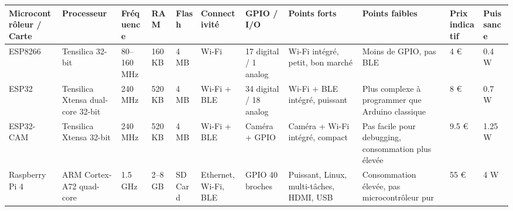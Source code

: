 \begin{landscape}
    \begin{table}[!ht]
        \centering
        \begin{tabularx}{\textwidth}{
            |p{3.5cm}|p{2.5cm}|p{2.2cm}|p{1.2cm}|p{1.4cm}|
            p{2.7cm}|p{2.5cm}|p{3cm}|p{3cm}|p{1.8cm}|p{2.2cm}|
            }
            \hline
            \textbf{Microcontrôleur / Carte} & \textbf{Processeur}               & \textbf{Fréquence}    & \textbf{RAM}            & \textbf{Flash} &
            \textbf{Connectivité}            & \textbf{GPIO / I/O}               & \textbf{Points forts} & \textbf{Points faibles} &
            \textbf{Prix indicatif}          & \textbf{Puissance}                                                                                                                                                                                                                                                                                     \\
            \hline
            ESP8266                          & Tensilica 32-bit                  & 80–160 MHz            & 160 KB                  & 4 MB           & Wi-Fi                & 17 digital / 1 analog  & Wi-Fi intégré, petit, bon marché                                       & Moins de GPIO, pas BLE                              & 4 €    & 0.4 W   \\
            \hline
            ESP32                            & Tensilica Xtensa dual-core 32-bit & 240 MHz               & 520 KB                  & 4 MB           & Wi-Fi + BLE          & 34 digital / 18 analog & Wi-Fi + BLE intégré, puissant                                          & Plus complexe à programmer que Arduino classique    & 8 €    & 0.7 W   \\
            \hline
            ESP32-CAM                        & Tensilica Xtensa 32-bit           & 240 MHz               & 520 KB                  & 4 MB           & Wi-Fi + BLE          & Caméra + GPIO          & Caméra + Wi-Fi intégré, compact                                        & Pas facile pour debugging, consommation plus élevée & 9.5 €  & 1.25 W  \\
            \hline
            Raspberry Pi 4                   & ARM Cortex-A72 quad-core          & 1.5 GHz               & 2–8 GB                  & SD Card        & Ethernet, Wi-Fi, BLE & GPIO 40 broches        & Puissant, Linux, multi-tâches, HDMI, USB                               & Consommation élevée, pas microcontrôleur pur        & 55 €   & 4 W     \\
            \hline

\end{tabularx}
\end{table}
\end{landscape}
